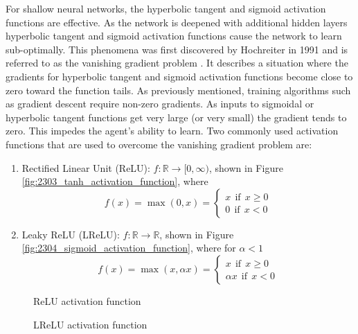 For shallow neural networks, the hyperbolic tangent and sigmoid activation functions are effective. As the network is deepened with additional hidden layers hyperbolic tangent and sigmoid activation functions  cause the network to learn sub-optimally. This phenomena was first discovered by Hochreiter in 1991 and is referred to as the vanishing gradient problem \cite{Hochreiter1991}. It describes a situation where the gradients for hyperbolic tangent and sigmoid activation functions become close to zero toward the function tails. As previously mentioned, training algorithms such as gradient descent require non-zero gradients. As inputs to sigmoidal or hyperbolic tangent functions get very large (or very small) the gradient tends to zero. This impedes the agent's ability to learn. Two commonly used activation functions that are used to overcome the vanishing gradient problem are:
\begin{enumerate}
	\item Rectified Linear Unit (ReLU): $f:\mathbb{R} \to [0,\infty)$, shown in Figure \ref{fig:2303_tanh_activation_function}, where
	\begin{equation}
		f(x) = \max(0,x) = \begin{cases}
							x \ \ \text{if} \ \ x \geq 0 \\
							0 \ \ \text{if} \ \ x < 0	
						   \end{cases}
	\end{equation}
	\item Leaky ReLU (LReLU): $f:\mathbb{R} \to \mathbb{R}$, shown in Figure \ref{fig:2304_sigmoid_activation_function}, where for $\alpha < 1$
	\begin{equation}
		f(x) = \max(x, \alpha x) =   \begin{cases}
									  x \ \ \text{if} \ \ x \geq 0 \\
									 \alpha x \ \ \text{if} \ \ x < 0	
			   						 \end{cases}
	\end{equation}
\end{enumerate}

\begin{figure}[h]
	\centering
	\begin{minipage}[t]{0.45\textwidth}
		\centering
		
		\caption[ReLU activation function]{ReLU activation function}
		\label{fig:2305_relu_activation_function}
	\end{minipage}
	\hspace{1cm}
	\begin{minipage}[t]{0.45\textwidth}
		\centering
		
		\caption[LReLU activation function]{LReLU activation function}
		\label{fig:2306_lrelu_activation_function}
	\end{minipage}
\end{figure}

